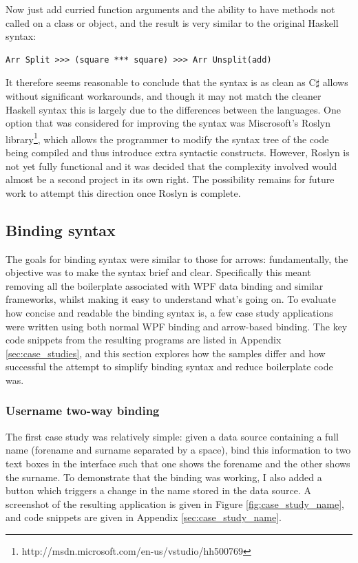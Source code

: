 \documentclass[12pt,twoside,notitlepage]{report}
\begin{document}
Now just add curried function arguments and the ability to have methods not called on a class or object, and the result is very similar to the original Haskell syntax:

\begin{lstlisting}
Arr Split >>> (square *** square) >>> Arr Unsplit(add)
\end{lstlisting}

It therefore seems reasonable to conclude that the syntax is as clean as C$\sharp$ allows without significant workarounds, and though it may not match the cleaner Haskell syntax this is largely due to the differences between the languages. One option that was considered for improving the syntax was Miscrosoft's Roslyn library\footnote{http://msdn.microsoft.com/en-us/vstudio/hh500769}, which allows the programmer to modify the syntax tree of the code being compiled and thus introduce extra syntactic constructs. However, Roslyn is not yet fully functional and it was decided that the complexity involved would almost be a second project in its own right. The possibility remains for future work to attempt this direction once Roslyn is complete.

\subsection{Binding syntax}

The goals for binding syntax were similar to those for arrows: fundamentally, the objective was to make the syntax brief and clear. Specifically this meant removing all the boilerplate associated with WPF data binding and similar frameworks, whilst making it easy to understand what's going on. To evaluate how concise and readable the binding syntax is, a few case study applications were written using both normal WPF binding and arrow-based binding. The key code snippets from the resulting programs are listed in Appendix \ref{sec:case_studies}, and this section explores how the samples differ and how successful the attempt to simplify binding syntax and reduce boilerplate code was.

\subsubsection{Username two-way binding}

The first case study was relatively simple: given a data source containing a full name (forename and surname separated by a space), bind this information to two text boxes in the interface such that one shows the forename and the other shows the surname. To demonstrate that the binding was working, I also added a button which triggers a change in the name stored in the data source. A screenshot of the resulting application is given in Figure \ref{fig:case_study_name}, and code snippets are given in Appendix \ref{sec:case_study_name}.
\end{document}
